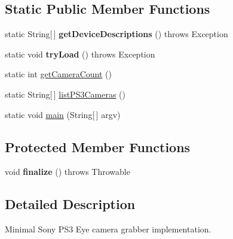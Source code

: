 \subsection*{Static Public Member Functions}
\begin{DoxyCompactItemize}
\item 
\hypertarget{classairhockeyjava_1_1detection_1_1_p_s3_eye_frame_grabber_aea414bb3f96c655cb4a16e5abab2ca5b}{}static String\mbox{[}$\,$\mbox{]} {\bfseries get\+Device\+Descriptions} ()  throws Exception \label{classairhockeyjava_1_1detection_1_1_p_s3_eye_frame_grabber_aea414bb3f96c655cb4a16e5abab2ca5b}

\item 
\hypertarget{classairhockeyjava_1_1detection_1_1_p_s3_eye_frame_grabber_a0470a85a98b633016689226b1caaf4a6}{}static void {\bfseries try\+Load} ()  throws Exception \label{classairhockeyjava_1_1detection_1_1_p_s3_eye_frame_grabber_a0470a85a98b633016689226b1caaf4a6}

\item 
static int \hyperlink{classairhockeyjava_1_1detection_1_1_p_s3_eye_frame_grabber_a593ea0d8a3b809f4877ea10277a5142b}{get\+Camera\+Count} ()
\item 
static String\mbox{[}$\,$\mbox{]} \hyperlink{classairhockeyjava_1_1detection_1_1_p_s3_eye_frame_grabber_a9476cdce57390c880e5bed7d6e49ad91}{list\+P\+S3\+Cameras} ()
\item 
static void \hyperlink{classairhockeyjava_1_1detection_1_1_p_s3_eye_frame_grabber_a503faec0ec1ecf3960c8d755bb938d08}{main} (String\mbox{[}$\,$\mbox{]} argv)
\end{DoxyCompactItemize}
\subsection*{Protected Member Functions}
\begin{DoxyCompactItemize}
\item 
\hypertarget{classairhockeyjava_1_1detection_1_1_p_s3_eye_frame_grabber_a10f83e4e9c383cb02bfb0a1e6e39cd14}{}void {\bfseries finalize} ()  throws Throwable \label{classairhockeyjava_1_1detection_1_1_p_s3_eye_frame_grabber_a10f83e4e9c383cb02bfb0a1e6e39cd14}

\end{DoxyCompactItemize}


\subsection{Detailed Description}
Minimal Sony P\+S3 Eye camera grabber implementation.

